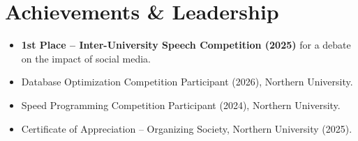 \section*{Achievements \& Leadership}

\begin{itemize}[leftmargin=*]
    \item \textbf{1st Place -- Inter-University Speech Competition (2025)} for a debate on the impact of social media.
    \item Database Optimization Competition Participant (2026), Northern University.
    \item Speed Programming Competition Participant (2024), Northern University.
    \item Certificate of Appreciation -- Organizing Society, Northern University (2025).
\end{itemize}